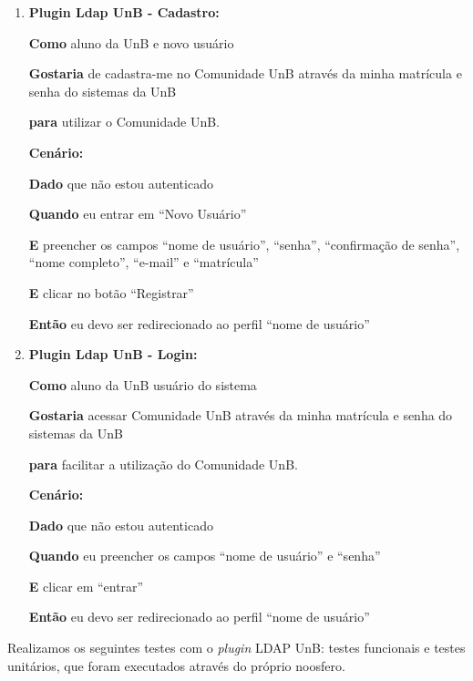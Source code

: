 \begin{enumerate}

\item \textbf{Plugin Ldap UnB - Cadastro:}

\textbf{Como} aluno da UnB e novo usuário

\textbf{Gostaria} de cadastra-me no Comunidade UnB através da minha matrícula e senha do sistemas da UnB

\textbf{para} utilizar o Comunidade UnB.

\textbf{Cenário:}

\textbf{Dado} que não estou autenticado

\textbf{Quando} eu entrar em ``Novo Usuário''

\textbf{E} preencher os campos ``nome de usuário'', ``senha'', ``confirmação de senha'', ``nome completo'', ``e-mail'' e ``matrícula''

\textbf{E} clicar no botão ``Registrar''

\textbf{Então} eu devo ser redirecionado ao perfil ``nome de usuário''


\item  \textbf{Plugin Ldap UnB - Login:}

\textbf{Como} aluno da UnB usuário do sistema

\textbf{Gostaria} acessar Comunidade UnB através da minha matrícula e senha do sistemas da UnB

\textbf{para} facilitar a utilização do Comunidade UnB.

\textbf{Cenário:}

\textbf{Dado} que não estou autenticado

\textbf{Quando} eu preencher os campos ``nome de usuário'' e ``senha''

\textbf{E} clicar em ``entrar''

\textbf{Então} eu devo ser redirecionado ao perfil ``nome de usuário''

\end{enumerate}

Realizamos os seguintes testes  com o \textit{plugin} LDAP UnB: testes funcionais e testes unitários, que foram executados através do próprio noosfero.

